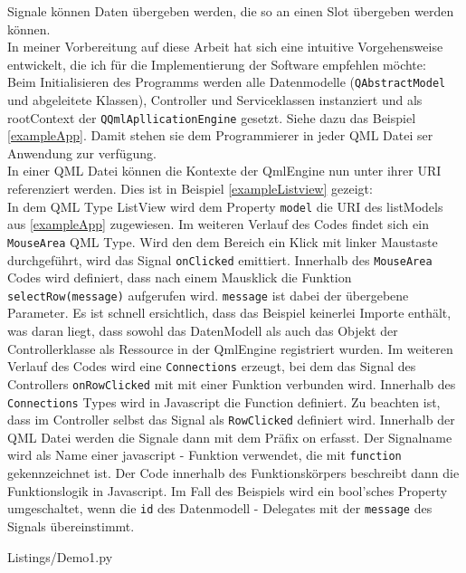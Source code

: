 Signale können Daten übergeben werden, die so an einen Slot übergeben werden können.\\
\vspace{1cm}
In meiner Vorbereitung auf diese Arbeit hat sich eine intuitive Vorgehensweise entwickelt, die ich für die Implementierung
der Software empfehlen möchte:\\
\vspace{1cm}
Beim Initialisieren des Programms werden alle Datenmodelle (\verb|QAbstractModel| und abgeleitete Klassen), Controller
und Serviceklassen instanziert und als rootContext der \verb|QQmlApllicationEngine| gesetzt.
Siehe dazu das Beispiel \ref{exampleApp}.
Damit stehen sie dem Programmierer in jeder QML Datei ser Anwendung zur verfügung.\\
In einer QML Datei können die Kontexte der QmlEngine nun unter ihrer URI referenziert werden. Dies ist in Beispiel
\ref{exampleListview} gezeigt:\\
In dem QML Type \glqq ListView \grqq wird dem Property \verb|model| die URI des listModels aus \ref{exampleApp} zugewiesen.
Im weiteren Verlauf des Codes findet sich ein \verb|MouseArea| QML Type.
Wird den dem Bereich ein Klick mit linker Maustaste durchgeführt, wird das Signal \verb|onClicked| emittiert.
Innerhalb des \verb|MouseArea| Codes wird definiert, dass nach einem Mausklick die Funktion \verb|selectRow(message)|
aufgerufen wird. \verb|message| ist dabei der übergebene Parameter.
Es ist schnell ersichtlich, dass das Beispiel keinerlei Importe enthält, was daran liegt, dass sowohl das DatenModell als
auch das Objekt der Controllerklasse als Ressource in der QmlEngine registriert wurden.
Im weiteren Verlauf des Codes wird eine \verb|Connections| erzeugt, bei dem das Signal des Controllers \verb|onRowClicked|
mit mit einer Funktion verbunden wird. Innerhalb des \verb|Connections| Types wird in Javascript die Function definiert.
Zu beachten ist, dass im Controller selbst das Signal als \verb|RowClicked| definiert wird.
Innerhalb der QML Datei werden die Signale dann mit dem Präfix \glqq on \grqq erfasst.
Der Signalname wird als Name einer javascript - Funktion verwendet, die mit \verb|function| gekennzeichnet ist.
Der Code innerhalb des Funktionskörpers beschreibt dann die Funktionslogik in Javascript.
Im Fall des Beispiels wird ein bool'sches Property umgeschaltet, wenn die \verb|id| des Datenmodell - Delegates mit der
\verb|message| des Signals übereinstimmt.


\lstset{
    basicstyle=\small\ttfamily
}
\newpage

{Listings/Demo1.py}\label{exampleApp}


